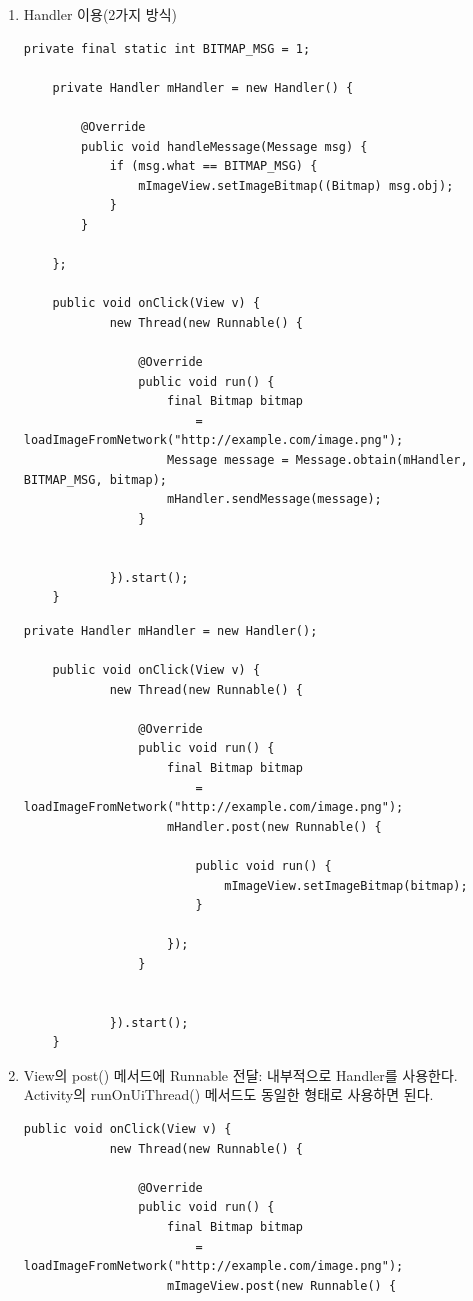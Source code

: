 \begin{enumerate}
\item Handler 이용(2가지 방식)
\begin{lstlisting}[frame=single]
	private final static int BITMAP_MSG = 1;
	
	private Handler mHandler = new Handler() {
		
		@Override
		public void handleMessage(Message msg) {
			if (msg.what == BITMAP_MSG) {
				mImageView.setImageBitmap((Bitmap) msg.obj);
			}
		}
		
	};
	
	public void onClick(View v) {
    		new Thread(new Runnable() {
    		
    			@Override
        		public void run() {
            		final Bitmap bitmap 
            			= loadImageFromNetwork("http://example.com/image.png");
            		Message message = Message.obtain(mHandler, BITMAP_MSG, bitmap);
            		mHandler.sendMessage(message);
        		}

	
    		}).start();
	}
\end{lstlisting}

\begin{lstlisting}[frame=single]
	private Handler mHandler = new Handler();
	
	public void onClick(View v) {
    		new Thread(new Runnable() {
    	
    			@Override
        		public void run() {
            		final Bitmap bitmap 
            			= loadImageFromNetwork("http://example.com/image.png");
            		mHandler.post(new Runnable() {
            		
                		public void run() {
                    		mImageView.setImageBitmap(bitmap);
                		}
                	
            		});
        		}

	
    		}).start();
	}
\end{lstlisting}

\item View의 post() 메서드에 Runnable 전달: 내부적으로 Handler를 사용한다. Activity의 runOnUiThread() 메서드도 동일한 형태로 사용하면 된다.
\begin{lstlisting}[frame=single] 
	public void onClick(View v) {
    		new Thread(new Runnable() {
    	
    			@Override
        		public void run() {
            		final Bitmap bitmap
            			= loadImageFromNetwork("http://example.com/image.png");
            		mImageView.post(new Runnable() {
            		

\end{lstlisting}
\end{enumerate}
